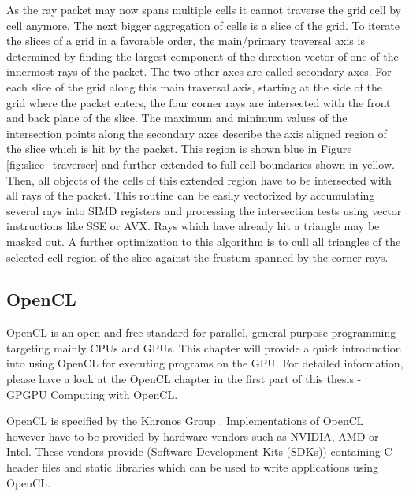 As the ray packet may now spans multiple cells it cannot traverse the grid cell by cell anymore. The next bigger aggregation of cells is a slice of the grid. To iterate the slices of a grid in a favorable order, the main/primary traversal axis is determined by finding the largest component of the direction vector of one of the innermost rays of the packet. The two other axes are called secondary axes. For each slice of the grid along this main traversal axis, starting at the side of the grid where the packet enters, the four corner rays are intersected with the front and back plane of the slice. The maximum and minimum values of the intersection points along the secondary axes describe the axis aligned region of the slice which is hit by the packet. This region is shown blue in Figure \ref{fig:slice_traverser} and further extended to full cell boundaries shown in yellow. Then, all objects of the cells of this extended region have to be intersected with all rays of the packet. This routine can be easily vectorized by accumulating several rays into SIMD registers and processing the intersection tests using vector instructions like SSE or AVX. Rays which have already hit a triangle may be masked out. A further optimization to this algorithm is to cull all triangles of the selected cell region of the slice against the frustum spanned by the corner rays.


\subsection{OpenCL}
OpenCL is an open and free standard for parallel, general purpose programming targeting mainly CPUs and GPUs. This chapter will provide a quick introduction into using OpenCL for executing programs on the GPU. For detailed information, please have a look at the OpenCL chapter in the first part of this thesis - GPGPU Computing with OpenCL.

\pagebreak

OpenCL is specified by the Khronos Group \cite{opencl_spec}. Implementations of OpenCL however have to be provided by hardware vendors such as NVIDIA, AMD or Intel. These vendors provide (Software Development Kits (SDKs)) containing C header files and static libraries which can be used to write applications using OpenCL.


